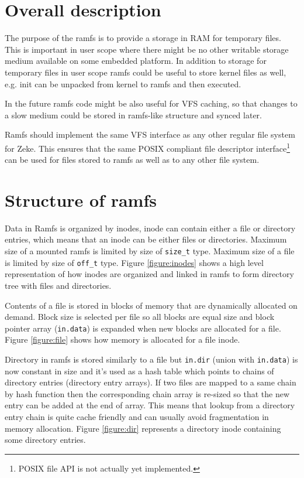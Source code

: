 \section{Overall description}

The purpose of the \acs{ramfs} is to provide a storage in RAM for temporary
files. This is important in user scope where there might be no other writable
storage medium available on some embedded platform. In addition to storage
for temporary files in user scope ramfs could be useful to store kernel files
as well, e.g. init can be unpacked from kernel to ramfs and then executed.

In the future ramfs code might be also useful for \acs{VFS} caching, so that
changes to a slow medium could be stored in ramfs-like structure and synced
later.

Ramfs should implement the same \acs{VFS} interface as any other regular
file system for Zeke. This ensures that the same POSIX compliant file
descriptor interface\footnote{POSIX file API is not actually yet implemented.}
can be used for files stored to ramfs as well as to any other file system.

\section{Structure of ramfs}

Data in Ramfs is organized by inodes, \acs{inode} can contain either a file or
directory entries, which means that an inode can be either files or directories.
Maximum size of a mounted ramfs is limited by size of \verb+size_t+ type.
Maximum size of a file is limited by size of \verb+off_t+ type. Figure
\ref{figure:inodes} shows a high level representation of how inodes are
organized and linked in ramfs to form directory tree with files and directories.

Contents of a file is stored in blocks of memory that are dynamically allocated
on demand. Block size is selected per file so all blocks are equal size and
block pointer array (\verb+in.data+) is expanded when new blocks are allocated
for a file. Figure \ref{figure:file} shows how memory is allocated for a file
inode.

Directory in ramfs is stored similarly to a file but \verb+in.dir+ (union with
\verb+in.data+) is now constant in size and it's used as a hash table which
points to chains of directory entries (directory entry arrays). If two files are
mapped to a same chain by hash function then the corresponding chain array is
re-sized so that the new entry can be added at the end of array. This means that
lookup from a directory entry chain is quite cache friendly and can usually
avoid fragmentation in memory allocation. Figure \ref{figure:dir} represents a
directory inode containing some directory entries.

